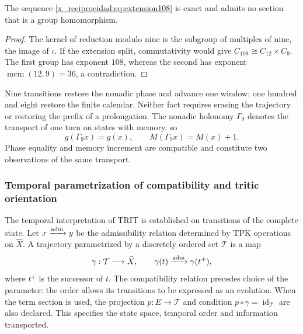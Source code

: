 \begin{proposition}
The sequence \eqref{x_reciprocidad:eq:extension108} is exact and admits no section that is a group homomorphism.
\end{proposition}
\begin{proof}
The kernel of reduction modulo nine is the subgroup of multiples of nine, the image of \(\iota\). If the extension split, commutativity would give \(C_{108}\cong C_{12}\times C_9\). The first group has exponent \(108\), whereas the second has exponent \(\operatorname{mcm}(12,9)=36\), a contradiction.
\end{proof}

Nine transitions restore the nonadic phase and advance one window; one hundred and eight restore the finite calendar. Neither fact requires erasing the trajectory or restoring the prefix of a prolongation. The nonadic holonomy \(\Gamma_9\) denotes the transport of one turn on states with memory, so
\begin{equation}
 g(\Gamma_9x)=g(x),\qquad M(\Gamma_9x)=M(x)+1.
 \label{x_reciprocidad:eq:holonomia-memoria}
\end{equation}
Phase equality and memory increment are compatible and constitute two observations of the same transport.


\subsubsection{Temporal parametrization of compatibility and tritic orientation}
\label{x_reciprocidad:trit-temporal-compatibilidad}

The temporal interpretation of TRIT is established on transitions of the
complete state. Let \(x\xrightarrow{\rm adm}y\) be the admissibility relation determined
by TPK operations on \(\widehat X\). A trajectory parametrized
by a discretely ordered set \(\mathcal T\) is a map
\[
 \gamma:\mathcal T\longrightarrow\widehat X,\qquad
 \gamma(t)\xrightarrow{\rm adm}\gamma(t^+),
\]
where \(t^+\) is the successor of \(t\). The compatibility relation precedes
choice of the parameter: the order allows its transitions to be expressed as
an evolution. When the term section is used, the projection
\(p:E\to\mathcal T\) and condition
\(p\circ\gamma=\operatorname{id}_{\mathcal T}\) are also declared. This specifies
the state space, temporal order and information transported.

